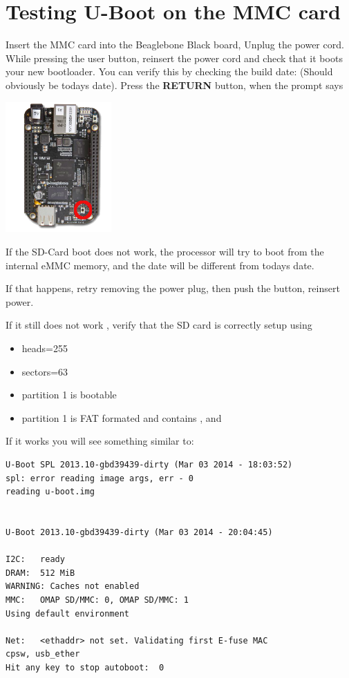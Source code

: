 \clearpage

\section{Testing U-Boot on the MMC card}

Insert the MMC card into the Beaglebone Black board, Unplug the power cord.
While pressing the user button, reinsert the power cord and check that it boots your new bootloader. 
You can verify this by checking the build date: (Should obviously be todays date). 
Press the {\bf RETURN} button, when the prompt says 

\begin{center}
    \includegraphics[height=5cm]{labs/sysdev-u-boot-BBB/beagleboneblack-user-button.png}
\end{center}

If the SD-Card boot does not work, the processor will try to boot from the internal eMMC memory,
and the date will be different from todays date.

If that happens, retry removing the power plug, then push the button, reinsert power.

If it still does not work , verify that the SD card is correctly setup using  

\begin{itemize}
\item heads=255
\item sectors=63
\item partition 1 is bootable
\item partition 1 is FAT formated and contains ,  and 
\end{itemize}


\clearpage

If it works you will see something similar to:

\begin{verbatim}
U-Boot SPL 2013.10-gbd39439-dirty (Mar 03 2014 - 18:03:52)
spl: error reading image args, err - 0
reading u-boot.img


U-Boot 2013.10-gbd39439-dirty (Mar 03 2014 - 20:04:45)

I2C:   ready
DRAM:  512 MiB
WARNING: Caches not enabled
MMC:   OMAP SD/MMC: 0, OMAP SD/MMC: 1
Using default environment

Net:   <ethaddr> not set. Validating first E-fuse MAC
cpsw, usb_ether
Hit any key to stop autoboot:  0 
\end{verbatim}

